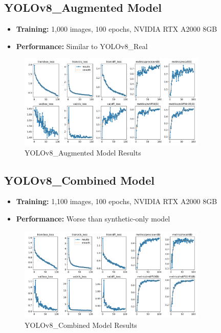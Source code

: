\documentclass{article}
\begin{document}
\subsection{YOLOv8\_Augmented Model}
\begin{itemize}
  \item \textbf{Training:} 1,000 images, 100 epochs, NVIDIA RTX A2000 8GB
  \item \textbf{Performance:} Similar to YOLOv8\_Real
\end{itemize}

\begin{figure}[htbp]
  \centering
  \includegraphics[width=0.8\textwidth]{./media/yolov8_aug_results.png}
  \caption{YOLOv8\_Augmented Model Results}
  \label{fig:augmented_results}
\end{figure}

\subsection{YOLOv8\_Combined Model}
\begin{itemize}
  \item \textbf{Training:} 1,100 images, 100 epochs, NVIDIA RTX A2000 8GB
  \item \textbf{Performance:} Worse than synthetic-only model
\end{itemize}
\begin{figure}[htbp]
  \centering
  \includegraphics[width=0.8\textwidth]{./media/yolov8_comb_results.png}
  \caption{YOLOv8\_Combined Model Results}
  \label{fig:combined_results}
\end{figure}
\end{document}
